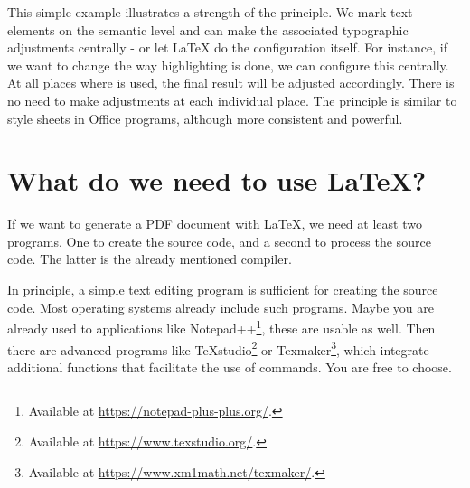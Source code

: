 
This simple example illustrates a strength of the  principle. 
We mark text elements on the semantic level and can make the associated typographic adjustments centrally - or let \LaTeX{} do the configuration itself.
For instance, if we want to change the way highlighting is done, we can configure this centrally. At all places where \texttt{\emph{}} is used, the final result will be adjusted accordingly. There is no need to make adjustments at each individual place. The principle is similar to style sheets in Office programs, although more consistent and powerful.


\section{What do we need to use \LaTeX{}?}
\label{subsec:what-we-need}

If we want to generate a PDF document with LaTeX, we need at least two programs. One to create the source code, and a second to process the source code. The latter is the already mentioned compiler.

In principle, a simple text editing program is sufficient for creating the source code. Most operating systems already include such programs. Maybe you are already used to applications like Notepad++\footnote{Available at \url{https://notepad-plus-plus.org/}.}, these are usable as well. Then there are advanced programs like \TeX{}studio\footnote{Available at \url{https://www.texstudio.org/}.} or Texmaker\footnote{Available at \url{https://www.xm1math.net/texmaker/}.}, which integrate additional functions that facilitate the use of commands. You are free to choose. 


